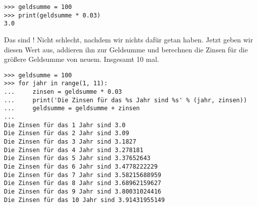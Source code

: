 \begin{Verbatim}[frame=single]
>>> geldsumme = 100
>>> print(geldsumme * 0.03)
3.0
\end{Verbatim}

Das sind ! Nicht schlecht, nachdem wir nichts dafür getan haben. Jetzt geben wir diesen Wert aus, addieren ihn zur Geldsumme und berechnen die Zinsen für die größere Geldsumme von neuem. Insgesamt 10 mal.

\begin{Verbatim}[frame=single]
>>> geldsumme = 100
>>> for jahr in range(1, 11):
...     zinsen = geldsumme * 0.03
...     print('Die Zinsen für das %s Jahr sind %s' % (jahr, zinsen))
...     geldsumme = geldsumme + zinsen
...
Die Zinsen für das 1 Jahr sind 3.0
Die Zinsen für das 2 Jahr sind 3.09
Die Zinsen für das 3 Jahr sind 3.1827
Die Zinsen für das 4 Jahr sind 3.278181
Die Zinsen für das 5 Jahr sind 3.37652643
Die Zinsen für das 6 Jahr sind 3.4778222229
Die Zinsen für das 7 Jahr sind 3.58215688959
Die Zinsen für das 8 Jahr sind 3.68962159627
Die Zinsen für das 9 Jahr sind 3.80031024416
Die Zinsen für das 10 Jahr sind 3.91431955149
\end{Verbatim}

